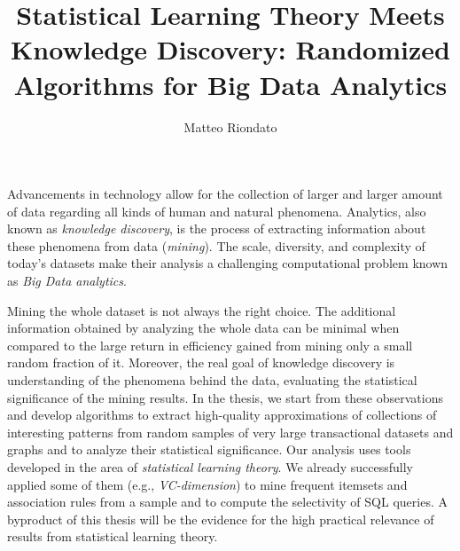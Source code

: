 \documentclass[12pt]{article}
\title{Statistical Learning Theory Meets Knowledge Discovery: Randomized Algorithms for Big Data Analytics}
\author{Matteo Riondato}
\date{}
\begin{document}
\maketitle
\thispagestyle{empty}
Advancements in technology %
allow for the collection of larger and larger  amount of data regarding all kinds of human
and natural %
phenomena.
Analytics, also known as \emph{knowledge discovery}, is the process of extracting
information about these phenomena from data (\emph{mining}). 
The scale, diversity, and complexity of today's datasets make their analysis a
challenging computational problem known as \emph{Big Data
analytics}.

Mining the whole dataset is not always the right choice. %
The additional information obtained by analyzing the whole data can be
minimal when compared to the large return in efficiency
gained from mining only a small random fraction of it. Moreover, %
the real goal of knowledge discovery is understanding of the phenomena behind 
the data, evaluating the statistical significance of the mining
results. In the thesis, we start from these observations and develop algorithms
to extract high-quality approximations of collections of interesting
patterns from random samples of very large transactional datasets and graphs and to
analyze their statistical significance. Our analysis uses 
tools developed in the area of \emph{statistical learning theory}. %
We already successfully applied some of them (e.g., \emph{VC-dimension}) 
to mine frequent itemsets and association rules from a
sample and to compute the selectivity of SQL queries. %
A byproduct of this thesis will be the evidence for the high practical relevance
of results from statistical learning theory.
\end{document}
